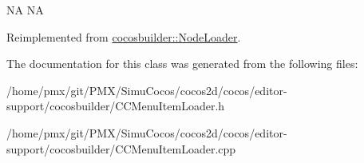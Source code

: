 NA  NA 

Reimplemented from \hyperlink{classcocosbuilder_1_1NodeLoader}{cocosbuilder\+::\+Node\+Loader}.



The documentation for this class was generated from the following files\+:\begin{DoxyCompactItemize}
\item 
/home/pmx/git/\+P\+M\+X/\+Simu\+Cocos/cocos2d/cocos/editor-\/support/cocosbuilder/C\+C\+Menu\+Item\+Loader.\+h\item 
/home/pmx/git/\+P\+M\+X/\+Simu\+Cocos/cocos2d/cocos/editor-\/support/cocosbuilder/C\+C\+Menu\+Item\+Loader.\+cpp\end{DoxyCompactItemize}
